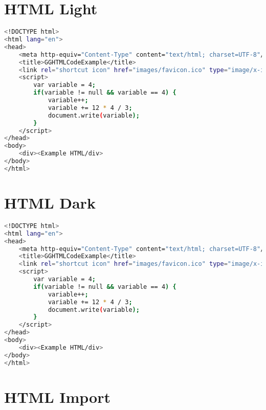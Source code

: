 \section{HTML Light}

\begin{lstlisting}[language=bash, style=customStyleHTMLLight, caption=Snippet title]
<!DOCTYPE html>
<html lang="en">
<head>
    <meta http-equiv="Content-Type" content="text/html; charset=UTF-8"/>
    <title>GGHTMLCodeExample</title>
    <link rel="shortcut icon" href="images/favicon.ico" type="image/x-icon">
    <script>
    	var variable = 4;
    	if(variable != null && variable == 4) {		
    		variable++;
    		variable += 12 * 4 / 3;
    		document.write(variable);
    	}
    </script>
</head>
<body>
    <div><Example HTML/div>
</body>
</html>
\end{lstlisting}

\section{HTML Dark}

\begin{lstlisting}[language=bash, style=customStyleHTMLDark, caption=Snippet title]
<!DOCTYPE html>
<html lang="en">
<head>
    <meta http-equiv="Content-Type" content="text/html; charset=UTF-8"/>
    <title>GGHTMLCodeExample</title>
    <link rel="shortcut icon" href="images/favicon.ico" type="image/x-icon">
    <script>
    	var variable = 4;
    	if(variable != null && variable == 4) {		
    		variable++;
    		variable += 12 * 4 / 3;
    		document.write(variable);
    	}
    </script>
</head>
<body>
    <div><Example HTML/div>
</body>
</html>
\end{lstlisting}

\section{HTML Import}

